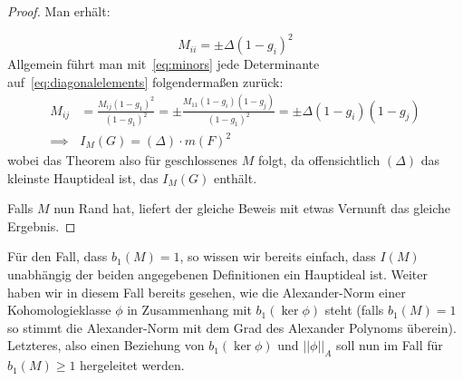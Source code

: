 \begin{proof}
	Man erhält:
	
	\begin{equation}
		M_{ii}= \pm \Delta (1-g_i)^2 \label{eq:diagonalelements}
	\end{equation}
	Allgemein führt man mit~\eqref{eq:minors} jede Determinante auf~\eqref{eq:diagonalelements} folgendermaßen zurück:
	\begin{align}
		M_{ij} &= \frac{M_{ij}(1-g_1)^2}{(1-g_1)^2} 
				= \pm \frac{M_{11}(1-g_i)(1-g_j)}{(1-g_1)^2}
				= \pm \Delta (1-g_i)(1-g_j)\\
		\implies &I_M(G) = (\Delta) \cdot m(F)^2 
	\end{align}
	wobei das Theorem also für geschlossenes $M$ folgt, da offensichtlich $(\Delta)$ das kleinste Hauptideal ist, das $I_M(G)$ enthält.

	Falls $M$ nun Rand hat, liefert der gleiche Beweis mit etwas Vernunft das gleiche Ergebnis. 
\end{proof} 

Für den Fall, dass $b_1(M)=1$, so wissen wir bereits einfach, dass $I(M)$ unabhängig der beiden angegebenen Definitionen ein Hauptideal ist. Weiter haben wir in diesem Fall bereits gesehen, wie die Alexander-Norm einer Kohomologieklasse $\phi$ in Zusammenhang mit $b_1(\ker \phi)$ steht (falls $b_1(M)=1$ so stimmt die Alexander-Norm mit dem Grad des Alexander Polynoms überein). Letzteres, also einen Beziehung von $b_1(\ker\phi)$ und $||\phi||_A$ soll nun im Fall für $b_1(M)\geq 1$ hergeleitet werden.

